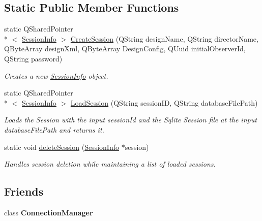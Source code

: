 \subsection*{Static Public Member Functions}
\begin{DoxyCompactItemize}
\item 
static Q\-Shared\-Pointer\\*
$<$ \hyperlink{class_session_info}{Session\-Info} $>$ \hyperlink{class_session_info_ab22e776e9d2e6047d8759a8e2d884fa4}{Create\-Session} (Q\-String design\-Name, Q\-String director\-Name, Q\-Byte\-Array design\-Xml, Q\-Byte\-Array Design\-Config, Q\-Uuid initial\-Observer\-Id, Q\-String password)
\begin{DoxyCompactList}\small\item\em Creates a new \hyperlink{class_session_info}{Session\-Info} object. \end{DoxyCompactList}\item 
static Q\-Shared\-Pointer\\*
$<$ \hyperlink{class_session_info}{Session\-Info} $>$ \hyperlink{class_session_info_a1f3c535a8c90e32cc0ec38caf2d0f42c}{Load\-Session} (Q\-String session\-I\-D, Q\-String database\-File\-Path)
\begin{DoxyCompactList}\small\item\em Loads the Session with the input session\-Id and the Sqlite Session file at the input database\-File\-Path and returns it. \end{DoxyCompactList}\item 
static void \hyperlink{class_session_info_a1a5929c7dfbfb94a18d7789c8c8ee6f2}{delete\-Session} (\hyperlink{class_session_info}{Session\-Info} $\ast$session)
\begin{DoxyCompactList}\small\item\em Handles session deletion while maintaining a list of loaded sessions. \end{DoxyCompactList}\end{DoxyCompactItemize}
\subsection*{Friends}
\begin{DoxyCompactItemize}
\item 
\hypertarget{class_session_info_aaeb08ae6da3a23c3562ab2c1fcfa6a0a}{class {\bfseries Connection\-Manager}}\label{class_session_info_aaeb08ae6da3a23c3562ab2c1fcfa6a0a}

\end{DoxyCompactItemize}


